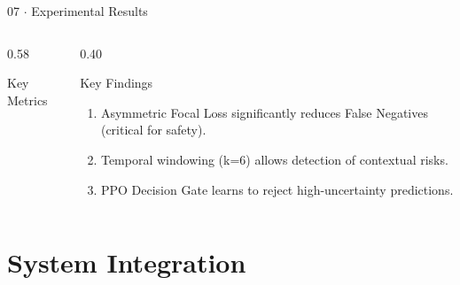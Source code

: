 \documentclass[aspectratio=169, 10pt]{beamer}
\begin{document}
\begin{frame}{07 $\cdot$ Experimental Results}
\begin{columns}[T]
\begin{column}{0.58\textwidth}
\begin{block}{Key Metrics}
            \end{block}

        \end{column}

        \begin{column}{0.40\textwidth}

            \begin{exampleblock}{Key Findings}

                \begin{enumerate}
                    \item Asymmetric Focal Loss significantly reduces False Negatives (critical for safety).
                    \item Temporal windowing (k=6) allows detection of contextual risks.
                    \item PPO Decision Gate learns to reject high-uncertainty predictions.
                \end{enumerate}

            \end{exampleblock}

        \end{column}

    \end{columns}

\end{frame}


\section{System Integration}
\end{document}
